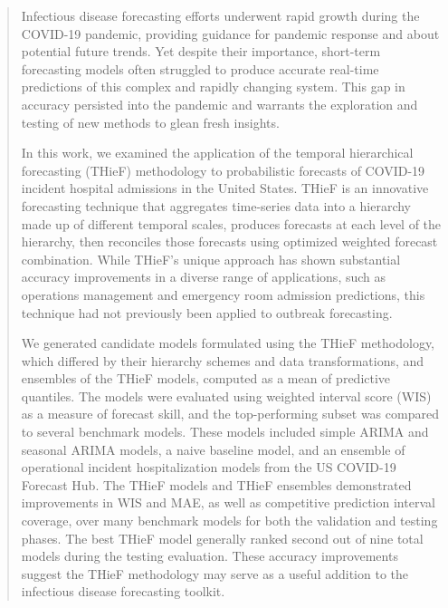 \documentclass[thesis]{umassthesis}  %
\begin{document}
\begin{abstract}                %
Infectious disease forecasting efforts underwent rapid growth during the COVID-19 pandemic, providing guidance for pandemic response and about potential future trends. Yet despite their importance, short-term forecasting models often struggled to produce accurate real-time predictions of this complex and rapidly changing system. This gap in accuracy persisted into the pandemic and warrants the exploration and testing of new methods to glean fresh insights.

In this work, we examined the application of the temporal hierarchical forecasting (THieF) methodology to probabilistic forecasts of COVID-19 incident hospital admissions in the United States. THieF is an innovative forecasting technique that aggregates time-series data into a hierarchy made up of different temporal scales, produces forecasts at each level of the hierarchy, then reconciles those forecasts using optimized weighted forecast combination. While THieF's unique approach has shown substantial accuracy improvements in a diverse range of applications, such as operations management and emergency room admission predictions, this technique had not previously been applied to outbreak forecasting.

We generated candidate models formulated using the THieF methodology, which differed by their hierarchy schemes and data transformations, and ensembles of the THieF models, computed as a mean of predictive quantiles. The models were evaluated using weighted interval score (WIS) as a measure of forecast skill, and the top-performing subset was compared to several benchmark models. These models included simple ARIMA and seasonal ARIMA models, a naive baseline model, and an ensemble of operational incident hospitalization models from the US COVID-19 Forecast Hub. The THieF models and THieF ensembles demonstrated improvements in WIS and MAE, as well as competitive prediction interval coverage, over many benchmark models for both the validation and testing phases. The best THieF model generally ranked second out of nine total models during the testing evaluation. These accuracy improvements suggest the THieF methodology may serve as a useful addition to the infectious disease forecasting toolkit.
\end{abstract}

\tableofcontents                %
\listoftables                   %
\listoffigures                  %
\end{document}
